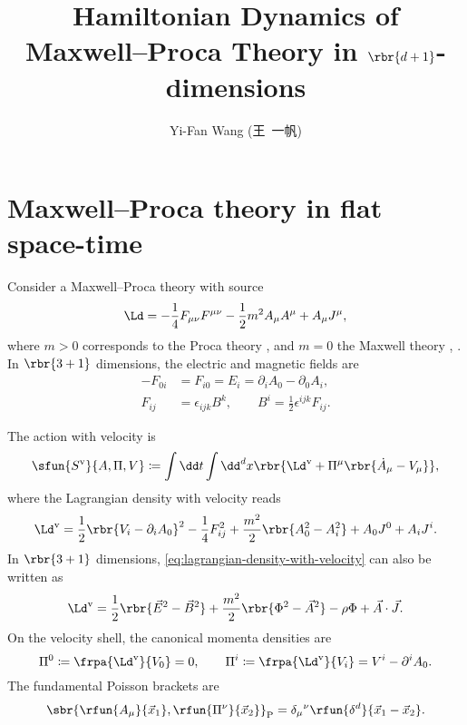 \documentclass[a4paper,11pt]{article}
\title{Hamiltonian Dynamics of Maxwell--Proca Theory in $\rbr{d+1}$-dimensions}
\author{Yi-Fan Wang (王\ 一帆)}
\begin{document}
\maketitle


\section{Maxwell--Proca theory in flat space-time}

Consider a Maxwell--Proca theory with source
\begin{equation}
\Ld = -\frac{1}{4} F_{\mu\nu} F^{\mu\nu} - \frac{1}{2} m^2 A_\mu A^\mu
+ A_\mu J^\mu,
\end{equation}
where $m > 0$ corresponds to the Proca theory \cite[sec.\ 2.3]{Gitman1990}, and 
$m = 0$ the Maxwell theory \cite[sec.\ 3.3.3]{Rothe2010}, \cite[sec.\ 
2.4]{Gitman1990}. In $\rbr{3+1}$ dimensions, the electric and magnetic fields 
are
\begin{align}
-F_{0i} &= F_{i0} = E_i = \partial_i A_0 - \partial_0 A_i, \\
F_{ij} &= \epsilon_{ijk}B^k, \qquad
B^i = \frac{1}{2} \epsilon^{ijk} F_{ij}.
\end{align}

The action with velocity is
\begin{align}
 \sfun{S^\text{v}}{A, \Pi, V} \coloneqq \int\dd t\int\dd^d x
\rbr{\Ld^\text{v} + \Pi^\mu\rbr{\dot A_\mu-V_\mu}},
\end{align}
where the Lagrangian density with velocity reads
\begin{align}
\Ld^\text{v} = \frac{1}{2} \rbr{V_i - \partial_i A_0}^2 - \frac{1}{4} F_{ij}^2 
+ \frac{m^2}{2} \rbr{A_0^2 - A_i^2} + A_0 J^0 + A_i J^i.
\label{eq:lagrangian-density-with-velocity}
\end{align}
In $\rbr{3+1}$ dimensions, \cref{eq:lagrangian-density-with-velocity} can also 
be written as
\begin{align}
\Ld^\text{v} = \frac{1}{2} \rbr{\vec E^2 - \vec B^2}
+ \frac{m^2}{2} \rbr{\Phi^2 - \vec A^2} - \rho\Phi + \vec A\cdot\vec J.
\end{align}
On the velocity shell, the canonical momenta densities are
\begin{equation}
\Pi^0 \coloneqq \frpa{\Ld^\text{v}}{V_0} = 0,\qquad
\Pi^i \coloneqq \frpa{\Ld^\text{v}}{V_i} = V^i - \partial^i A_0.
\end{equation}
The fundamental Poisson brackets are
\begin{equation}
\sbr{\rfun{A_\mu}{\vec x_1}, \rfun{\Pi^\nu}{\vec x_2}}_\text{P} =
\delta_\mu{}^\nu\rfun{\delta^d}{\vec x_1 - \vec x_2}.
\end{equation}
\end{document}
